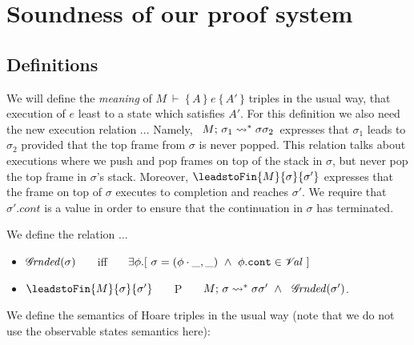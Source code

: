 


\section{Soundness of our proof system}

\subsection{Definitions}

We will define the {\emph {meaning}} of  $M\ \vdash\  \{\, A \,  \}\ e\  \{\, A' \, \}$ triples in the usual way, \ie that execution of $e$ least to a state which satisfies $A'$. For this definition we also need the new execution relation ...
Namely, \ $M;\, {\sigma_1} \rightsquigarrow^* \sigma {\sigma_2}$\  expresses that $\sigma_1$ leads to $\sigma_2$ provided
 that the top frame from $\sigma$ is never popped. This relation talks about executions where we push and pop frames on top of the stack in $\sigma$, but never pop the top frame in $\sigma$'s stack. Moreover, $\leadstoFin {M} {\sigma} {\sigma'}$  expresses that the frame on top of $\sigma$ executes to completion and reaches $\sigma'$.
We require that $\sigma'.cont$ is a value in order to ensure that the continuation in $\sigma$ has terminated. 
 
{
\begin{definition}
\label{def:term}
We define the relation  ...
\begin{itemize}
\item
${\mathcal G}\!\mathit{rnded}(\sigma)$ \ \ \ iff \ \ \  $\exists \phi. [\ \sigma = (\phi\cdot\_,\_) \ \wedge \ \phi.\texttt{cont} \in {\mathcal V}\!\mathit{al} \ ]$
\item
$\leadstoFin {M} {\sigma} {\sigma'}$ \ \ \ P \ \ \  $\leadstoBoundedStar {M} {\sigma} {\sigma} {\sigma'} \ \wedge \ \ \Final{\sigma'}$.
\end{itemize}
\end{definition}
}

We define the semantics of Hoare triples in the usual way (note that we do not use the observable states semantics here): 

